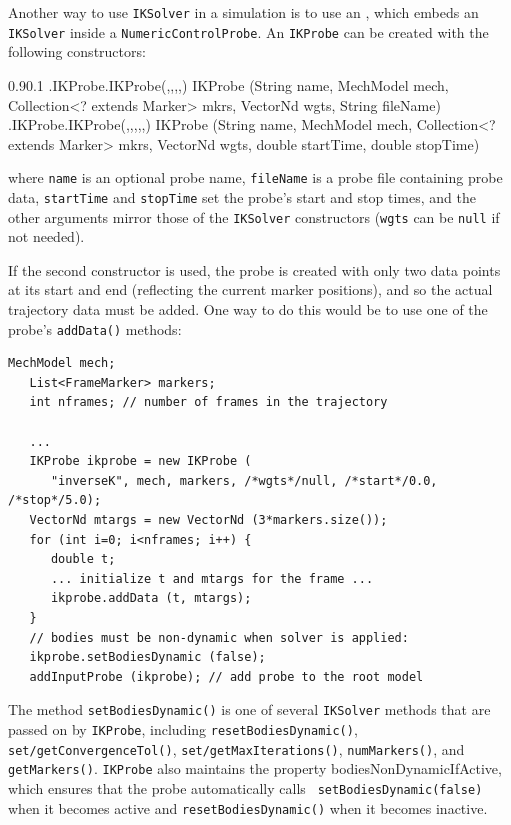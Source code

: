 Another way to use {\tt IKSolver} in a simulation is to use an
, which embeds an {\tt IKSolver}
inside a\pdfbreak 
{\tt NumericControlProbe}. An {\tt IKProbe} can be created with the
following constructors:
%
\begin{methodtable}{0.9}{0.1}
%
\methodentry
{\probes.IKProbe.IKProbe(,,,,)}%
{IKProbe (String name, MechModel mech, Collection<? extends Marker> mkrs,\brh
VectorNd wgts, String fileName)}%
{\ }%
%
\methodentry
{\probes.IKProbe.IKProbe(,,,,,)}%
{IKProbe (String name, MechModel mech, Collection<? extends Marker> mkrs,\brh
VectorNd wgts, double startTime, double stopTime)}%
{\ }%
%
\end{methodtable}
%
where {\tt name} is an optional probe name, {\tt fileName} is a probe file
containing probe data, {\tt startTime} and {\tt stopTime} set the probe's start
and stop times, and the other arguments mirror those of the {\tt IKSolver}
constructors ({\tt wgts} can be {\tt null} if not needed).

If the second constructor is used, the probe is created with only two data
points at its start and end (reflecting the current marker positions), and so
the actual trajectory data must be added. One way to do this would be to use
one of the probe's {\tt addData()} methods:
%
\begin{lstlisting}[]
   MechModel mech;
   List<FrameMarker> markers;
   int nframes; // number of frames in the trajectory

   ...
   IKProbe ikprobe = new IKProbe (
      "inverseK", mech, markers, /*wgts*/null, /*start*/0.0, /*stop*/5.0);
   VectorNd mtargs = new VectorNd (3*markers.size());
   for (int i=0; i<nframes; i++) {
      double t;
      ... initialize t and mtargs for the frame ...
      ikprobe.addData (t, mtargs);
   }
   // bodies must be non-dynamic when solver is applied:
   ikprobe.setBodiesDynamic (false);
   addInputProbe (ikprobe); // add probe to the root model
\end{lstlisting}
%
The method {\tt setBodiesDynamic()} is one of several {\tt IKSolver} methods
that are passed on by {\tt IKProbe}, including {\tt resetBodiesDynamic()}, {\tt
set/getConvergenceTol()}, {\tt set/getMaxIterations()}, {\tt numMarkers()}, and
{\tt getMarkers()}. {\tt IKProbe} also maintains the property {\sf
bodiesNonDynamicIfActive}, which ensures that the probe automatically calls {\tt
setBodiesDynamic(false)} when it becomes active and {\tt resetBodiesDynamic()}
when it becomes inactive.

